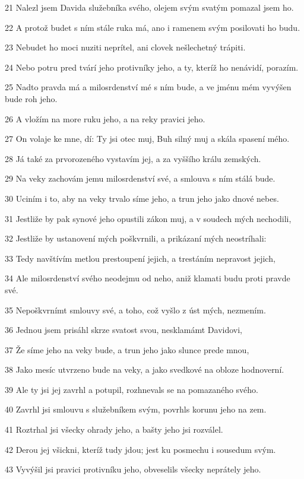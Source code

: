 \par 21 Nalezl jsem Davida služebníka svého, olejem svým svatým pomazal jsem ho.
\par 22 A protož budet s ním stále ruka má, ano i ramenem svým posilovati ho budu.
\par 23 Nebudet ho moci nuziti neprítel, ani clovek nešlechetný trápiti.
\par 24 Nebo potru pred tvárí jeho protivníky jeho, a ty, kteríž ho nenávidí, porazím.
\par 25 Nadto pravda má a milosrdenství mé s ním bude, a ve jménu mém vyvýšen bude roh jeho.
\par 26 A vložím na more ruku jeho, a na reky pravici jeho.
\par 27 On volaje ke mne, dí: Ty jsi otec muj, Buh silný muj a skála spasení mého.
\par 28 Já také za prvorozeného vystavím jej, a za vyššího králu zemských.
\par 29 Na veky zachovám jemu milosrdenství své, a smlouva s ním stálá bude.
\par 30 Uciním i to, aby na veky trvalo síme jeho, a trun jeho jako dnové nebes.
\par 31 Jestliže by pak synové jeho opustili zákon muj, a v soudech mých nechodili,
\par 32 Jestliže by ustanovení mých poškvrnili, a prikázaní mých neostríhali:
\par 33 Tedy navštívím metlou prestoupení jejich, a trestáním nepravost jejich,
\par 34 Ale milosrdenství svého neodejmu od neho, aniž klamati budu proti pravde své.
\par 35 Nepoškvrnímt smlouvy své, a toho, což vyšlo z úst mých, nezmením.
\par 36 Jednou jsem prisáhl skrze svatost svou, nesklamámt Davidovi,
\par 37 Že síme jeho na veky bude, a trun jeho jako slunce prede mnou,
\par 38 Jako mesíc utvrzeno bude na veky, a jako svedkové na obloze hodnoverní.
\par 39 Ale ty jsi jej zavrhl a potupil, rozhnevals se na pomazaného svého.
\par 40 Zavrhl jsi smlouvu s služebníkem svým, povrhls korunu jeho na zem.
\par 41 Roztrhal jsi všecky ohrady jeho, a bašty jeho jsi rozválel.
\par 42 Derou jej všickni, kteríž tudy jdou; jest ku posmechu i sousedum svým.
\par 43 Vyvýšil jsi pravici protivníku jeho, obveselils všecky neprátely jeho.
